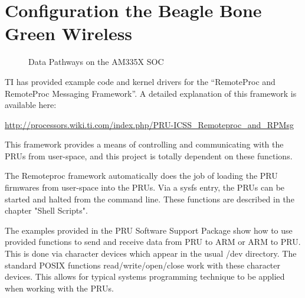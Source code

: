 %
%
%

\chapter{Configuration the Beagle Bone Green Wireless}

\begin{figure}[h]
	\centering
	\centering\bfseries
	\caption{Data Pathways on the AM335X SOC}
\end{figure}

TI has provided example code and kernel drivers for the ``RemoteProc and RemoteProc Messaging Framework''.  A detailed explanation of this framework is available here:

\url{http://processors.wiki.ti.com/index.php/PRU-ICSS_Remoteproc_and_RPMsg}

This framework provides a means of controlling and communicating with the PRUs from user-space, and this project is totally dependent on these functions.

The Remoteproc framework automatically does the job of loading the PRU firmwares from user-space into the PRUs.  Via a sysfs entry, the PRUs can be started and halted from the command line.  These functions are described in the chapter "Shell Scripts".

The examples provided in the PRU Software Support Package show how to use provided functions to send and receive data from PRU to ARM or ARM to PRU.  This is done via character devices which appear in the usual /dev directory.  The standard POSIX functions read/write/open/close work with these character devices.  This allows for typical systems programming technique to be applied when working with the PRUs.

